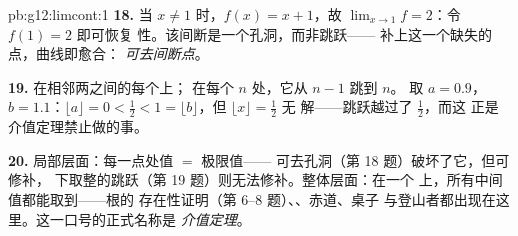 \begin{solution}{pb:g12:limcont:1}
\textbf{18.} 当 $x \neq 1$ 时，$f(x) = x + 1$，故
$\lim_{x \to 1} f = 2$：令 $f(1) = 2$ 即可恢复
性。该间断是一个孔洞，而非跳跃——
补上这一个缺失的点，曲线即愈合：
\emph{可去间断点}。

\textbf{19.} 在相邻两之间的每个上；
在每个 $n$ 处，它从 $n - 1$ 跳到 $n$。
取 $a = 0.9$，$b = 1.1$：$\lfloor a \rfloor = 0 < \frac12 <
1 = \lfloor b \rfloor$，但 $\lfloor x \rfloor = \frac12$ 无
解——跳跃越过了 $\frac12$，而这
正是介值定理禁止做的事。

\textbf{20.} 局部层面：每一点处值 $=$ 极限值——
可去孔洞（第 18 题）破坏了它，但可修补，
下取整的跳跃（第 19 题）则无法修补。整体层面：在一个
上，所有中间值都能取到——根的
存在性证明（第 6--8 题）、、赤道、桌子
与登山者都出现在这里。这一口号的正式名称是
\emph{介值定理}。
\end{solution}
